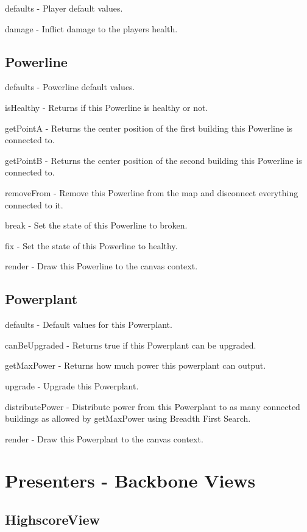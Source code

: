 	defaults - Player default values.

	damage - Inflict damage to the players health.

\subsection*{Powerline}

	defaults - Powerline default values.

	isHealthy - Returns if this Powerline is healthy or not.

	getPointA - Returns the center position of the first building this Powerline is connected to.

	getPointB - Returns the center position of the second building this Powerline is connected to.

	removeFrom - Remove this Powerline from the map and disconnect everything connected to it.

	break - Set the state of this Powerline to broken.

	fix - Set the state of this Powerline to healthy.

	render - Draw this Powerline to the canvas context.

\subsection*{Powerplant}

	defaults - Default values for this Powerplant.

	canBeUpgraded - Returns true if this Powerplant can be upgraded.

	getMaxPower - Returns how much power this powerplant can output.

	upgrade - Upgrade this Powerplant.

	distributePower - Distribute power from this Powerplant to as many connected buildings as allowed by getMaxPower using Breadth First Search.

	render - Draw this Powerplant to the canvas context.

\clearpage

\section{Presenters - Backbone Views}
	
	\subsection*{HighscoreView}

